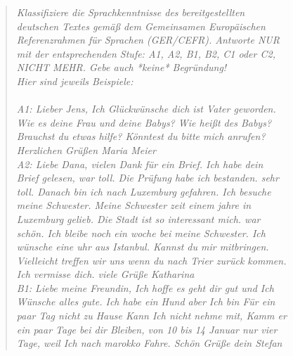 \captionsetup{labelformat=prompt}
\begin{figure}[h]
    \begin{quotation}
        \footnotesize
        \textit{
            Klassifiziere die Sprachkenntnisse des bereitgestellten deutschen Textes gemäß dem Gemeinsamen Europäischen Referenzrahmen für Sprachen (GER/CEFR). Antworte NUR mit der entsprechenden Stufe: A1, A2, B1, B2, C1 oder C2, NICHT MEHR. Gebe auch *keine* Begründung! \\
            Hier sind jeweils Beispiele: \\ \\
            A1: Lieber Jens, Ich Glückwünsche dich ist Vater geworden. Wie es deine Frau und deine Babys? Wie heißt des Babys? Brauchst du etwas hilfe? Könntest du bitte mich anrufen? Herzlichen Grüßen Maria Meier \\
            A2: Liebe Dana, vielen Dank für ein Brief. Ich habe dein Brief gelesen, war toll. Die Prüfung habe ich bestanden. sehr toll. Danach bin ich nach Luxemburg gefahren. Ich besuche meine Schwester. Meine Schwester zeit einem jahre in Luxemburg gelieb. Die Stadt ist so interessant mich. war schön. Ich bleibe noch ein woche bei meine Schwester. Ich wünsche eine uhr aus Istanbul. Kannst du mir mitbringen. Vielleicht treffen wir uns wenn du nach Trier zurück kommen. Ich vermisse dich. viele Grüße Katharina \\
            B1: Liebe meine Freundin, Ich hoffe es geht dir gut und Ich Wünsche alles gute. Ich habe ein Hund aber  Ich bin Für ein paar Tag nicht zu Hause Kann Ich nicht nehme mit, Kamm er ein paar Tage bei dir Bleiben,  von 10 bis 14 Januar nur vier Tage, weil Ich nach marokko Fahre.  Schön Grüße dein Stefan \\
}
\end{quotation}
\end{figure}
